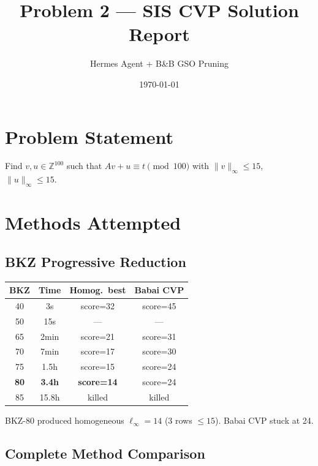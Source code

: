 \documentclass[11pt,a4paper]{article}
\title{Problem 2 --- SIS CVP Solution Report}
\author{Hermes Agent + B\&B GSO Pruning}
\date{\today}
\begin{document}
\maketitle

\section{Problem Statement}
Find $v, u \in \mathbb{Z}^{100}$ such that
$Av + u \equiv t \pmod{100}$ with $\|v\|_\infty \le 15$, $\|u\|_\infty \le 15$.

\section{Methods Attempted}

\subsection{BKZ Progressive Reduction}

\begin{center}
\begin{tabular}{cccc}
\toprule
BKZ & Time & Homog.\ best & Babai CVP \\
\midrule
40  & 3s      & score=32 & score=45 \\
50  & 15s     & ---      & --- \\
65  & 2min    & score=21 & score=31 \\
70  & 7min    & score=17 & score=30 \\
75  & 1.5h    & score=15 & score=24 \\
\textbf{80} & \textbf{3.4h} & \textbf{score=14} & score=24 \\
85  & 15.8h   & killed   & killed \\
\bottomrule
\end{tabular}
\end{center}

BKZ-80 produced homogeneous $\ell_\infty=14$ (3 rows $\le 15$). Babai CVP stuck at 24.

\subsection{Complete Method Comparison}
\end{document}
